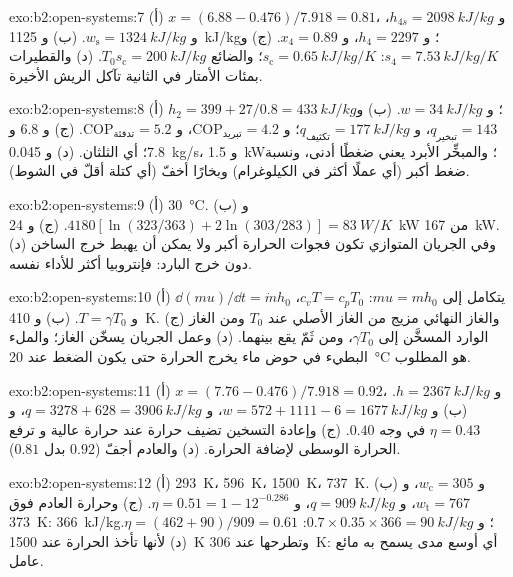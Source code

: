 \begin{solution}{exo:b2:open-systems:7}
(أ) $x = (6.88 - 0.476)/7.918 = 0.81$، و $h_{4s} = \qty{2098}{kJ/kg}$، و $w_{\text{s}} =
\qty{1324}{kJ/kg}$. (ب) و \qty{1125}{kJ/kg}؛ و $h_4 = 2297$، و $x_4 = 0.89$. (ج) و $s_4 =
\qty{7.53}{kJ/kg/K}$: $s_{\text{c}} = \qty{0.65}{kJ/kg/K}$؛ والضائع $T_0s_{\text{c}} =
\qty{200}{kJ/kg}$. (د) والقطيرات بمئات الأمتار في الثانية تآكل
الريش الأخيرة.
\end{solution}

\begin{solution}{exo:b2:open-systems:8}
(أ) $h_2 = 399 + 27/0.8 = \qty{433}{kJ/kg}$؛ و $w = \qty{34}{kJ/kg}$. (ب) و $q_{\text{تبخير}}
= 143$، و $q_{\text{تكثيف}} = \qty{177}{kJ/kg}$؛ و $\mathrm{COP}_{\text{تبريد}} = 4.2$،
و $\mathrm{COP}_{\text{تدفئة}} = 5.2$. (ج) و $6.8$ و $7.8$؛ أي الثلثان. (د) و \qty{0.045}{kg/s}،
و \qty{1.5}{kW}؛ والمبخِّر الأبرد يعني ضغطًا أدنى، ونسبة ضغط
أكبر (أي عملًا أكثر في الكيلوغرام) وبخارًا أخفّ (أي كتلة
أقلّ في الشوط).
\end{solution}

\begin{solution}{exo:b2:open-systems:9}
(أ) \qty{30}{\celsius}. (ب) و $4180[\ln(323/363) + 2\ln(303/283)] = \qty{83}{W/K}$.
(ج) و \qty{24}{kW} من \qty{167}{kW}. (د) وفي الجريان المتوازي تكون فجوات الحرارة
أكبر ولا يمكن أن يهبط خرج الساخن دون خرج البارد: فإنتروبيا
أكثر للأداء نفسه.
\end{solution}

\begin{solution}{exo:b2:open-systems:10}
(أ) $\dd(mu)/\dd t = \dot m h_0$ يتكامل إلى $mu = mh_0$: $c_vT = c_pT_0$،
و $T = \gamma T_0$. (ب) و \qty{410}{K}. (ج) والغاز النهائي مزيج من
الغاز الأصلي عند $T_0$ ومن الغاز الوارد المسخَّن إلى $\gamma T_0$، ومن ثَمّ
يقع بينهما. (د) وعمل الجريان يسخّن الغاز؛ والملء البطيء في حوض
ماء يخرج الحرارة حتى يكون الضغط عند \qty{20}{\celsius} هو
المطلوب.
\end{solution}

\begin{solution}{exo:b2:open-systems:11}
(أ) $x = (7.76 - 0.476)/7.918 = 0.92$، و $h = \qty{2367}{kJ/kg}$. (ب) و $w = 572 + 1111
- 6 = \qty{1677}{kJ/kg}$، و $q = 3278 + 628 = \qty{3906}{kJ/kg}$، و $\eta = 0.43$
في وجه $0.40$. (ج) وإعادة التسخين تضيف حرارة عند حرارة عالية و
ترفع الحرارة الوسطى لإضافة الحرارة. (د) والعادم أجفّ
($0.92$ بدل $0.81$).
\end{solution}

\begin{solution}{exo:b2:open-systems:12}
(أ) \qty{293}{K}، \qty{596}{K}، \qty{1500}{K}، \qty{737}{K}. (ب) و $w_{\text{c}} = 305$،
و $w_{\text{t}} = 767$، و $q = \qty{909}{kJ/kg}$، و $\eta = 0.51 = 1 - 12^{-0.286}$. (ج)
وحرارة العادم فوق \qty{373}{K}: \qty{366}{kJ/kg}؛ و $0.7 \times 0.35 \times 366 =
\qty{90}{kJ/kg}$: $\eta = (462 + 90)/909 = 0.61$. (د) لأنها تأخذ الحرارة عند
\qty{1500}{K} وتطرحها عند \qty{306}{K}: أي أوسع مدى يسمح به مائع
عامل.
\end{solution}

